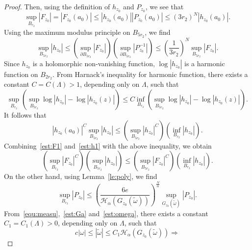 \documentclass[a4paper,reqno]{amsart}
\theoremstyle{definition}
\numberwithin{equation}{section}
\begin{document}
\begin{proof}
Then, using the definition of $h_{z_{0}}$ and $P_{z_{0}}$, we see that  
\begin{equation}\label{est:F1}
    \sup_{B_{r_{2}}}|F_{z_{0}}|=|F_{z_{0}}(a_{0})|\le |h_{z_{0}}(a_{0})||P_{z_{0}}(a_{0})|\le (3r_{2})^{N}|h_{z_{0}}(a_{0})|. 
    \end{equation}
    Using the maximum modulus principle on $B_{5r_{2}}$, we find
    \begin{equation}\label{est:h1}
    \sup_{B_{5r_{2}}}|h_{z_{0}}|\le \left(\sup_{\partial{B_{5r_{2}}}}|F_{z_{0}}|\right)\left(\sup_{\partial{B_{5r_{2}}}}|P_{z_{0}}^{-1}|\right)\le \left(\frac{1}{3r_{2}}\right)^{N}   \sup_{{B_{5r_{2}}}}|F_{z_{0}}|.
\end{equation}
Since $h_{z_{0}}$ is a holomorphic non-vanishing function, $\log |h_{z_{0}}|$ is a harmonic function on $B_{2r_{2}}$. From Harnack's inequality for harmonic function, there exists a constant $C=C(\Lambda)>1$, depending only on $\Lambda$, such that 
\begin{equation*}
    \sup_{B_{r_{2}}}\left(\sup_{B_{5r_{2}}}\log |h_{z_{0}}|-\log |h_{z_{0}}(z)|\right)\le 
    C\inf_{B_{r_{2}}}\left(\sup_{B_{5r_{2}}}\log |h_{z_{0}}|-\log |h_{z_{0}}(z)|\right).
\end{equation*}
It follows that 
\begin{equation*}
    |h_{z_{0}}(a_{0})|^{C}\sup_{B_{5r_{2}}}|h_{z_{0}}|\le 
    \left(\sup_{B_{5r_{2}}}|h_{z_{0}}|^{C}\right)
    \left(\inf_{B_{r_{2}}}|h_{z_{0}}|\right).
\end{equation*}
Combining~\eqref{est:F1} and~\eqref{est:h1} with the above inequality, we obtain
\begin{equation}\label{est:F}
\left(\sup_{B_{r_{2}}}|F_{z_{0}}|^{C}\right)\left(\sup_{B_{5r_{2}}}|h_{z_{0}}|\right)\le \left(\sup_{B_{5r_{2}}}|F_{z_{0}}|^{C}\right)\left(\inf_{B_{r_{2}}}|h_{z_{0}}|\right).
\end{equation}
On the other hand, using Lemma~\ref{le:poly}, we find 
\begin{equation*}
    \sup_{B_{r_{2}}}|P_{z_{0}}|\le \left(\frac{6e}{\mathcal{H}_{\alpha}(G_{z_{0}}(\widetilde{\omega}))}\right)^{\frac{N}{\alpha}}\sup_{G_{z_{0}}(\widetilde{\omega})}|P_{z_{0}}|.
\end{equation*}
From~\eqref{equ:measu},~\eqref{est:Ga} and~\eqref{est:omega}, there exists a constant $C_{1}=C_{1}(\Lambda)>0$, depending only on $\Lambda$, such that
\begin{equation}\label{est:P}
  c|\omega|\le  |\widetilde{\omega}|\le C_{1}\mathcal{H}_{\alpha}(G_{z_{0}}(\widetilde{\omega}))\Longrightarrow

\end{equation}
\end{proof}
\end{document}
